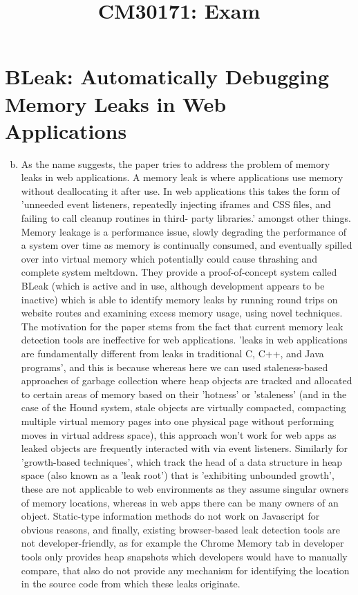 \documentclass[12pt]{article}
\title{CM30171: Exam}
\begin{document}
\maketitle
\section{BLeak: Automatically Debugging Memory Leaks in
Web Applications}

\begin{enumerate}[(a)] %
    \setcounter{enumi}{1}
    \item As the name suggests, the paper tries to address the problem of memory leaks in web applications. A memory leak is where applications use memory without deallocating it after use. In web applications this takes the form of 'unneeded event listeners, repeatedly injecting iframes
    and CSS files, and failing to call cleanup routines in third-
    party libraries.' amongst other things. Memory leakage is a performance issue, slowly degrading the performance of a system over time as memory is continually consumed, and eventually spilled over into virtual memory which potentially could cause thrashing and complete system meltdown. They provide a proof-of-concept system called BLeak (which is active and in use\supercite{vilk_berger}, although development appears to be inactive) which is able to identify memory leaks by running round trips on website routes and examining excess memory usage, using novel techniques. The motivation for the paper stems from the fact that current memory leak detection tools are ineffective for web applications. 'leaks in web applications are fundamentally
    different from leaks in traditional C, C++, and Java programs', and this is because whereas here we can used staleness-based approaches of garbage collection\supercite{10.1145/1542476.1542521} where heap objects are tracked and allocated to certain areas of memory based on their 'hotness' or 'staleness' (and in the case of the Hound system, stale objects are virtually compacted, compacting multiple virtual memory pages into one physical page without performing moves in virtual address space), this approach won't work for web apps as leaked objects are frequently interacted with via event listeners. Similarly for 'growth-based techniques'\supercite{10.1007/978-3-540-45070-2_16}, which track the head of a data structure in heap space (also known as a 'leak root') that is 'exhibiting unbounded growth', these are not applicable to web environments as they assume singular owners of memory locations, whereas in web apps there can be many owners of an object. Static-type information methods do not work on Javascript for obvious reasons, and finally, existing browser-based leak detection tools are not developer-friendly, as for example the Chrome Memory tab in developer tools only provides heap snapshots which developers would have to manually compare, that also do not provide any mechanism for identifying the location in the source code from which these leaks originate. 

\end{enumerate}
\end{document}
